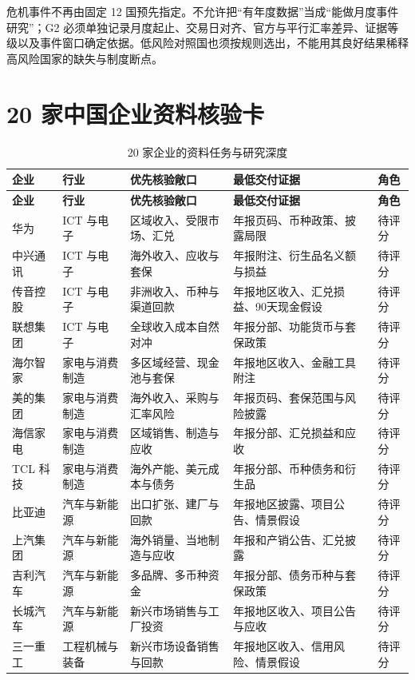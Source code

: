 \documentclass[UTF8,12pt,openany]{ctexbook}
\begin{document}
危机事件不再由固定 12 国预先指定。不允许把“有年度数据”当成“能做月度事件研究”；G2 必须单独记录月度起止、交易日对齐、官方与平行汇率差异、证据等级以及事件窗口确定依据。低风险对照国也须按规则选出，不能用其良好结果稀释高风险国家的缺失与制度断点。

\section{20 家中国企业资料核验卡}
\small
\begin{longtable}{p{2.1cm}p{2.0cm}p{2.7cm}p{4.1cm}p{1.9cm}}
\caption{20 家企业的资料任务与研究深度}\label{tab:company-task-card}\\
\toprule
\textbf{企业} & \textbf{行业} & \textbf{优先核验敞口} & \textbf{最低交付证据} & \textbf{角色}\\
\midrule
\endfirsthead
\toprule
\textbf{企业} & \textbf{行业} & \textbf{优先核验敞口} & \textbf{最低交付证据} & \textbf{角色}\\
\midrule
\endhead
华为 & ICT 与电子 & 区域收入、受限市场、汇兑 & 年报页码、币种政策、披露局限 & 待评分\\
中兴通讯 & ICT 与电子 & 海外收入、应收与套保 & 年报附注、衍生品名义额与损益 & 待评分\\
传音控股 & ICT 与电子 & 非洲收入、币种与渠道回款 & 年报地区收入、汇兑损益、90天现金假设 & 待评分\\
联想集团 & ICT 与电子 & 全球收入成本自然对冲 & 年报分部、功能货币与套保政策 & 待评分\\
海尔智家 & 家电与消费制造 & 多区域经营、现金池与套保 & 年报地区收入、金融工具附注 & 待评分\\
美的集团 & 家电与消费制造 & 海外收入、采购与汇率风险 & 年报页码、套保范围与风险披露 & 待评分\\
海信家电 & 家电与消费制造 & 区域销售、制造与应收 & 年报分部、汇兑损益和应收 & 待评分\\
TCL 科技 & 家电与消费制造 & 海外产能、美元成本与债务 & 年报分部、币种债务和衍生品 & 待评分\\
比亚迪 & 汽车与新能源 & 出口扩张、建厂与回款 & 年报地区披露、项目公告、情景假设 & 待评分\\
上汽集团 & 汽车与新能源 & 海外销量、当地制造与应收 & 年报和产销公告、汇兑披露 & 待评分\\
吉利汽车 & 汽车与新能源 & 多品牌、多币种资金 & 年报分部、债务币种与套保政策 & 待评分\\
长城汽车 & 汽车与新能源 & 新兴市场销售与工厂投资 & 年报地区收入、项目公告与应收 & 待评分\\
三一重工 & 工程机械与装备 & 新兴市场设备销售与回款 & 年报地区收入、信用风险、情景假设 & 待评分\\

\end{longtable}
\end{document}
